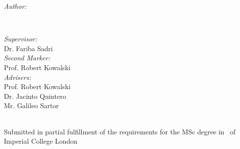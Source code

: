 \begin{titlepage}
\begin{minipage}{0.4\textwidth}
\begin{flushleft} \large
\emph{Author:}\\
\reportauthor %
\end{flushleft}
\end{minipage}
~
\begin{minipage}{0.4\textwidth}
\begin{flushright} \large
\emph{Supervisor:} \\
Dr. Fariba Sadri %
\\ \vspace{5mm}
\emph{Second Marker:} \\ 
Prof. Robert Kowalski 
\\ \vspace{5mm}
\emph{Advisers:} \\
Prof. Robert Kowalski \\
Dr. Jacinto Quintero \\ 
Mr. Galileo  Sartor
\end{flushright}
\end{minipage}\\[4cm]


\vfill %
Submitted in partial fulfillment of the requirements for the MSc degree in
\degreetype~of Imperial College London\\[0.5cm]

\makeatletter
\@date 
\makeatother


\end{titlepage}
